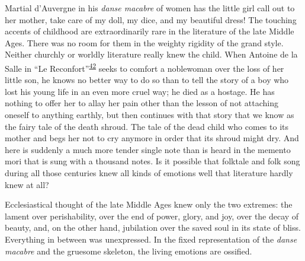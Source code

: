 Martial d'Auvergne in his \emph{danse macabre} of women has the little
girl call out to her mother, take care of my doll, my dice, and my
beautiful dress! The touching accents of childhood are extraordinarily
rare in the literature of the late Middle Ages. There was no room for
them in the weighty rigidity of the grand style. Neither churchly or
worldly literature really knew the child. When Antoine de la Salle in
``Le
Reconfort''\textsuperscript{\protect\hypertarget{12_Chapter_Five__THE_VISION_OF_DEAT.xhtmlux5cux23id_1271}{\protect\hyperlink{23_NOTES.xhtmlux5cux23id_1272}{42}}}
seeks to comfort a noblewoman over the loss of her little son, he knows
no better way to do so than to tell the story of a boy who lost his
young life in an even more cruel way; he died as a hostage. He has
nothing to offer her to allay her pain other than the lesson of not
attaching oneself to anything earthly, but then continues with that
story that we know as the fairy tale of the death shroud. The tale of
the dead child who comes to its mother and begs her not to cry anymore
in order that its shroud might dry. And here is suddenly a much more
tender single note than is heard in the memento mori that is sung with a
thousand notes. Is it possible that folktale and folk song during all
\protect\hypertarget{12_Chapter_Five__THE_VISION_OF_DEAT.xhtmlux5cux23page_172}{}{}those
centuries knew all kinds of emotions well that literature hardly knew at
all?

Ecclesiastical thought of the late Middle Ages knew only the two
extremes: the lament over perishability, over the end of power, glory,
and joy, over the decay of beauty, and, on the other hand, jubilation
over the saved soul in its state of bliss. Everything in between was
unexpressed. In the fixed representation of the \emph{danse macabre} and
the gruesome skeleton, the living emotions are ossified.
